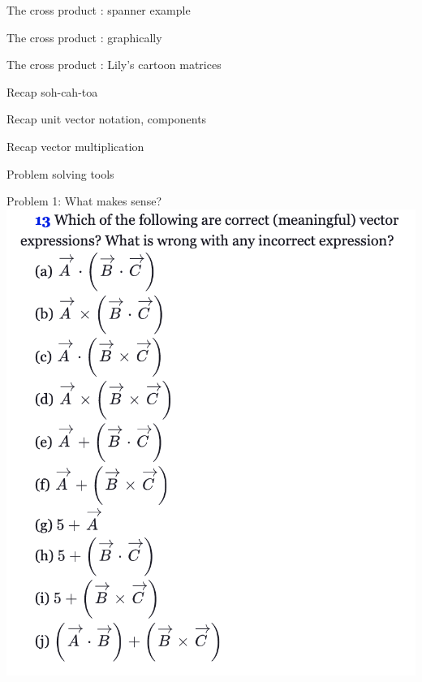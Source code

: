  \begin{frame}{The cross product : spanner example}
\small

\end{frame}

  \begin{frame}{The cross product : graphically }
\small

\end{frame}

  \begin{frame}{The cross product : Lily's cartoon matrices }
\small

\end{frame}


  \begin{frame}{Recap soh-cah-toa}
\small

\end{frame}



  \begin{frame}{Recap unit vector notation, components}
\small

\end{frame}

  \begin{frame}{Recap vector multiplication}
\small

\end{frame}

  \begin{frame}{Problem solving tools}
\small

\end{frame}

  \begin{frame}{Problem 1: What makes sense?}
\small
\includegraphics[scale=0.34]{whichmakesense}
\end{frame}

